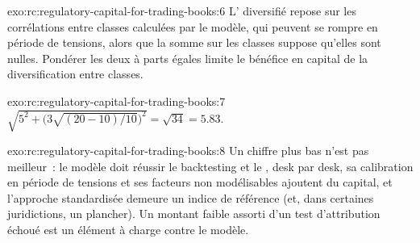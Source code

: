\begin{solution}{exo:rc:regulatory-capital-for-trading-books:6}
L' diversifié repose sur les corrélations entre classes calculées par le modèle, qui peuvent se rompre en
période de tensions, alors que la somme sur les classes suppose qu'elles sont nulles. Pondérer les deux à parts égales limite
le bénéfice en capital de la diversification entre classes.
\end{solution}

\begin{solution}{exo:rc:regulatory-capital-for-trading-books:7}
$\sqrt{5^2+\bigl(3\sqrt{(20-10)/10}\bigr)^2} = \sqrt{34} = 5.83$.
\end{solution}

\begin{solution}{exo:rc:regulatory-capital-for-trading-books:8}
Un chiffre plus bas n'est pas meilleur~: le modèle doit réussir le backtesting et le , desk par desk, sa calibration
en période de tensions et ses facteurs non modélisables ajoutent du capital, et l'approche standardisée demeure un indice de référence
(et, dans certaines juridictions, un plancher). Un montant faible assorti d'un test d'attribution échoué est
un élément à charge contre le modèle.
\end{solution}

